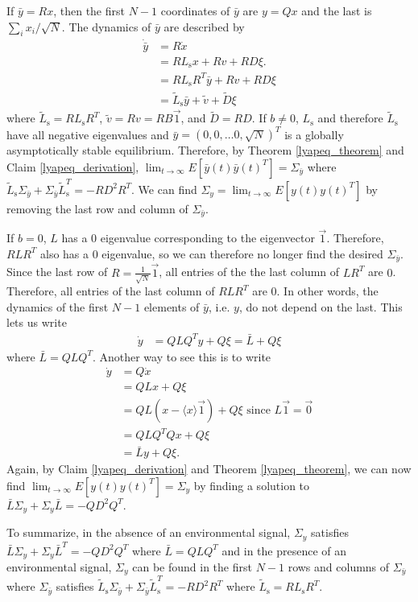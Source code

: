 \documentclass{article}
\begin{document}
If $\bar{y}=Rx$, then the first $N-1$ coordinates of $\bar{y}$ are $y=Qx$ and the last is $\sum_ix_i/\sqrt{N}$. The dynamics of $\bar{y}$ are described by 
\begin{align*}
\dot{\bar{y}}&=R\dot{x}
\\&=RL_\text{s}x+Rv+RD\xi.
\\&=RL_\text{s}R^T\bar{y}+Rv+RD\xi
\\&=\tilde{L}_\text{s}\bar{y}+\tilde{v}+\tilde{D}\xi 
\end{align*}
where $\tilde{L}_\text{s}=RL_\text{s}R^T$, $\tilde{v}=Rv=RB\vec{1}$, and $\tilde{D}=RD$. If $b\neq 0$, $L_\text{s}$ and therefore $\tilde{L}_\text{s}$ have all negative eigenvalues and $\bar{y}=(0, 0, \dots 0, \sqrt{N})^T$ is a globally asymptotically stable equilibrium. Therefore, by Theorem \ref{lyapeq_theorem} and Claim \ref{lyapeq_derivation}, $\lim_{t\to\infty}E[\bar{y}(t)\bar{y}(t)^T]=\Sigma_{\bar{y}}$ where $\tilde{L}_\text{s}\Sigma_{\bar{y}}+\Sigma_{\bar{y}}\tilde{L}_\text{s}^T=-RD^2R^T$. We can  find $\Sigma_y=\lim_{t\to\infty}E[y(t)y(t)^T]$
by removing the last row and column of $\Sigma_{\bar{y}}$.

If $b=0$, $L$ has a $0$ eigenvalue corresponding to the eigenvector $\vec{1}$. Therefore, $RLR^T$ also has a $0$ eigenvalue, so we can therefore no longer find the desired $\Sigma_{\bar{y}}$.  Since the last row of $R=\frac{1}{\sqrt{N}}\vec{1}$, all entries of the the last column of $LR^T$ are $0$. Therefore, all entries of the last column of $RLR^T$ are $0$. In other words, the dynamics of the first $N-1$ elements of $\bar{y}$, i.e. $y$, do not depend on the last. This lets us write 
\begin{align*}
\dot{y}&=QLQ^Ty+Q\xi=\bar{L}+Q\xi
\end{align*}
where $\bar{L}=QLQ^T$. Another way to see this is to write 
\begin{align*}
 \dot{y}&=Q\dot{x}
 \\ &=QLx+Q\xi
 \\&=QL(x-\langle x\rangle \vec{1})+Q\xi \text{ since $L\vec{1}=\vec{0}$}
 \\&=QLQ^TQx+Q\xi
 \\&=\bar{L}y+Q\xi.
\end{align*}
Again, by Claim \ref{lyapeq_derivation} and Theorem \ref{lyapeq_theorem}, we can now find $\lim_{t\to\infty}E[y(t)y(t)^T]=\Sigma_y$ by finding a solution to $\bar{L}\Sigma_y+\Sigma_y\bar{L}=-QD^2Q^T$. 

To summarize, in the absence of an environmental signal, $\Sigma_y$ satisfies $\bar{L}\Sigma_y+\Sigma_y\bar{L}^T=-QD^2Q^T$ where $\bar{L}=QLQ^T$ and in the presence of an environmental signal, $\Sigma_y$ can be found in the first $N-1$ rows and columns of $\Sigma_{\bar{y}}$ where $\Sigma_{\bar{y}}$ satisfies $\tilde{L}_\text{s}\Sigma_{\bar{y}}+\Sigma_{\bar{y}}\tilde{L}_\text{s}^T=-RD^2R^T$ where $\tilde{L}_\text{s}=RL_\text{s}R^T$.
\end{document}
